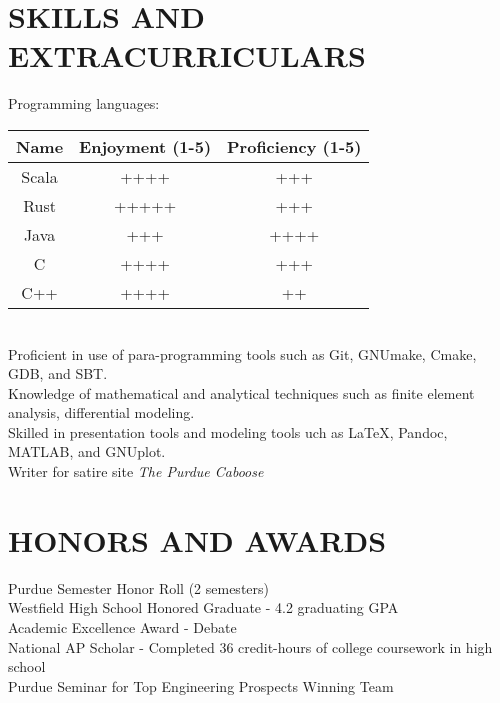 \documentclass[10pt]{res}
\begin{document}
\begin{resume}
\vspace{-10pt}\section{SKILLS AND EXTRACURRICULARS}          
  Programming languages:\\
  \begin{tabular}{c | c | c}
    \hline
    Name & Enjoyment (1-5) & Proficiency (1-5) \\\hline
    Scala & ++++ & +++ \\
    Rust & +++++ & +++ \\
    Java & +++ & ++++ \\
    C & ++++ & +++ \\
    C++ & ++++ & ++ \\
    \hline
  \end{tabular}\\
	Proficient in use of para-programming tools such as Git, GNUmake, Cmake, GDB, and SBT. \\
	Knowledge of mathematical and analytical techniques such as finite element analysis, differential modeling. \\
	Skilled in presentation tools and modeling tools uch as \LaTeX, Pandoc, MATLAB, and GNUplot. \\
	Writer for satire site \emph{The Purdue Caboose}
 
\vspace{-10pt}\section{HONORS AND AWARDS}          
  Purdue Semester Honor Roll (2 semesters) \\
	Westfield High School Honored Graduate - 4.2 graduating GPA \\
	Academic Excellence Award - Debate \\
	National AP Scholar - Completed 36 credit-hours of college coursework in high school \\
	Purdue Seminar for Top Engineering Prospects Winning Team \\

\end{resume}
\end{document}
